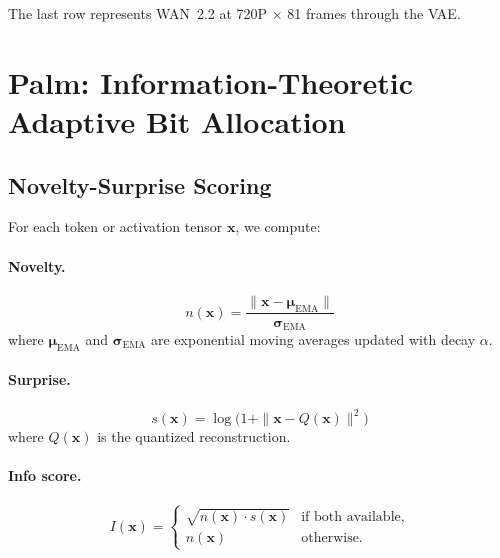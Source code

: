 \documentclass[11pt,a4paper]{article}
\begin{document}
The last row represents WAN~2.2 at 720P $\times$ 81 frames through the VAE.

\section{Palm: Information-Theoretic Adaptive Bit Allocation}

\subsection{Novelty-Surprise Scoring}

For each token or activation tensor $\mathbf{x}$, we compute:

\paragraph{Novelty.}
\begin{equation}
  n(\mathbf{x}) = \frac{\|\mathbf{x} - \boldsymbol{\mu}_\text{EMA}\|}{\boldsymbol{\sigma}_\text{EMA}}
\end{equation}
where $\boldsymbol{\mu}_\text{EMA}$ and $\boldsymbol{\sigma}_\text{EMA}$ are exponential moving averages updated with decay $\alpha$.

\paragraph{Surprise.}
\begin{equation}
  s(\mathbf{x}) = \log\!\bigl(1 + \|\mathbf{x} - Q(\mathbf{x})\|^2\bigr)
\end{equation}
where $Q(\mathbf{x})$ is the quantized reconstruction.

\paragraph{Info score.}
\begin{equation}\label{eq:info-score}
  I(\mathbf{x}) =
  \begin{cases}
    \sqrt{n(\mathbf{x}) \cdot s(\mathbf{x})} & \text{if both available,} \\
    n(\mathbf{x}) & \text{otherwise.}
  \end{cases}
\end{equation}
\end{document}
